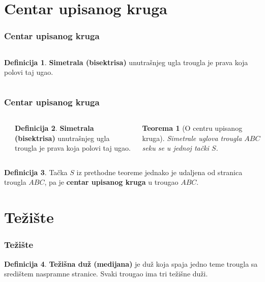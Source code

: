 \documentclass{beamer}
\newtheorem{teorema}{{Teorema}}[section]
\theoremstyle{definition}
\newtheorem{definicija}{{Definicija}}
\begin{document}
\section{Centar upisanog kruga}
\begin{frame}
\frametitle{\bf Centar upisanog kruga}
\begin{columns}[t]
	\pause
		
			\begin{definicija}
\alert{\bf Simetrala (bisektrisa)} unutra\v{s}njeg ugla trougla je prava koja polovi taj ugao.
\end{definicija}
			
\end{columns}


\end{frame}
\begin{frame}
\frametitle{\bf Centar upisanog kruga}
\begin{columns}[t]
	\begin{center}
				\resizebox{2.3in}{!}{}
			\end{center}
		
			\begin{definicija}
\alert{\bf Simetrala (bisektrisa)} unutra\v{s}njeg ugla trougla je prava koja polovi taj ugao.
\end{definicija}
			
			\begin{teorema}[O centru upisanog kruga]
Simetrale uglova trougla $ABC$ seku se u jednoj ta\v{c}ki $S$.
\end{teorema}

			
		\end{columns}
		
			
\pause

\begin{definicija}
Ta\v{c}ka $S$ iz prethodne teoreme jednako je udaljena od stranica trougla $ABC$, pa je \alert{\bf centar upisanog kruga} u trougao $ABC$.
\end{definicija}   
\end{frame}

\section{Te\v{z}i\v{s}te}
\begin{frame}
\frametitle{\bf Te\v{z}i\v{s}te}
\pause
\begin{definicija}
\alert{\bf Te\v{z}i\v{s}na du\v{z} (medijana)} je du\v{z} koja spaja jedno teme trougla sa sredi\v{s}tem naspramne stranice.
\pause
Svaki trougao ima tri te\v{z}i\v{s}ne du\v{z}i.
\end{definicija}
\pause 
		\begin{center}
			\resizebox{1.8in}{!}{}
		\end{center}
		
\end{frame}
\end{document}
